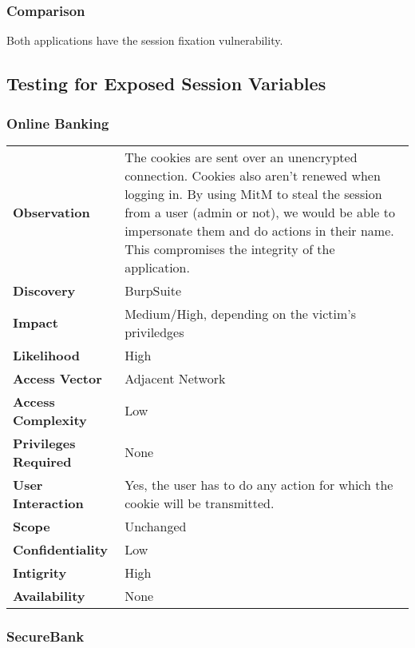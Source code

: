 \subsubsection*{Comparison}
Both applications have the session fixation vulnerability.

\clearpage


\subsection{Testing for Exposed Session Variables}

\subsubsection*{Online Banking}

\begin{tabular}{l|p{10cm}}
\textbf{Observation} & The cookies are sent over an unencrypted connection. Cookies also aren't renewed when logging in. By using MitM to steal the session from a user (admin or not), we would be able to impersonate them and do actions in their name. This compromises the integrity of the application. \\
\textbf{Discovery} & BurpSuite \\
\textbf{Impact} & Medium/High, depending on the victim's priviledges \\
\textbf{Likelihood} & High \\
\textbf{Access Vector} & Adjacent Network \\
\textbf{Access Complexity} & Low\\
\textbf{Privileges Required} & None \\
\textbf{User Interaction} & Yes, the user has to do any action for which the cookie will be transmitted. \\
\textbf{Scope} & Unchanged \\
\textbf{Confidentiality} & Low \\
\textbf{Intigrity} & High\\
\textbf{Availability} & None \\
\end{tabular}

\subsubsection*{SecureBank}

